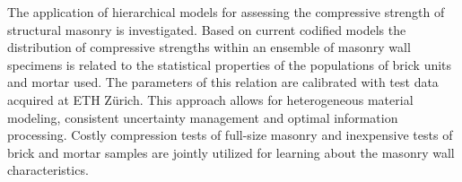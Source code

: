 The application of hierarchical models for assessing the compressive strength of structural masonry is investigated.
Based on current codified models the distribution of compressive strengths within an ensemble of masonry wall specimens
is related to the statistical properties of the populations of brick units and mortar used.
The parameters of this relation are calibrated with test data acquired at ETH Z\"{u}rich.
This approach allows for heterogeneous material modeling, consistent uncertainty management and optimal information processing.
Costly compression tests of full-size masonry and inexpensive tests of brick and mortar samples are jointly utilized for learning about the masonry wall characteristics.